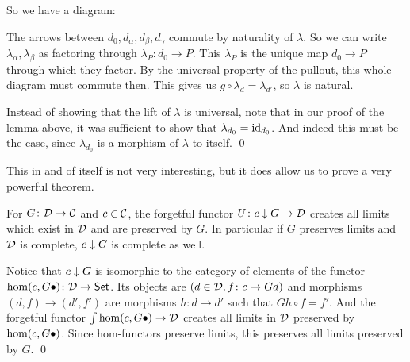     So we have a diagram:

    \centerline{}

    The arrows between $d_0,d_\alpha,d_\beta,d_\gamma$ commute by naturality of $\lambda$.
    So we can write $\lambda_\alpha,\lambda_\beta$ as factoring through $\lambda_P\colon d_0\to P$.
    This $\lambda_P$ is the unique map $d_0\to P$ through which they factor.
    By the universal property of the pullout, this whole diagram must commute then.
    This gives us $g\circ\lambda_d=\lambda_{d'}$, so $\lambda$ is natural.

    Instead of showing that the lift of $\lambda$ is universal, note that in our proof of the lemma above, it was sufficient to show that $\lambda_{d_0}={\rm id}_{d_0}$.
    And indeed this must be the case, since $\lambda_{d_0}$ is a morphism of $\lambda$ to itself.
    \qed

\eproof

This in and of itself is not very interesting, but it does allow us to prove a very powerful theorem.

\blemm

    For $G\colon{{\cal D}}\to{{\cal C}}$ and $c\in{{\cal C}}$, the forgetful functor $U\colon c\downarrow G\to{{\cal D}}$ creates all limits which exist in ${{\cal D}}$ and are preserved by $G$.
    In particular if $G$ preserves limits and ${{\cal D}}$ is complete, $c\downarrow G$ is complete as well.

\elemm

\bproof

    Notice that $c\downarrow G$ is isomorphic to the category of elements of the functor $\hom(c,G\bullet)\colon{{\cal D}}\to{\sf Set}$.
    Its objects are $(d\in{{\cal D}},f\colon c\to Gd)$ and morphisms $(d,f)\to(d',f')$ are morphisms $h\colon d\to d'$ such that $Gh\circ f=f'$.
    And the forgetful functor $\int\hom(c,G\bullet)\to{{\cal D}}$ creates all limits in ${{\cal D}}$ preserved by $\hom(c,G\bullet)$.
    Since hom-functors preserve limits, this preserves all limits preserved by $G$.
    \qed

